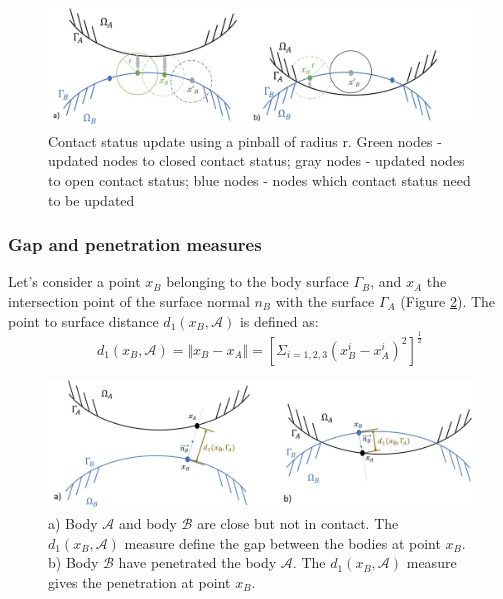 \begin{figure}[!h]
\centering
\includegraphics[width=1\textwidth,keepaspectratio]{figures/pinball.jpg} 
\caption{Contact status update using a pinball of radius r. Green nodes - updated nodes to closed contact status; gray nodes - updated nodes to open contact status; blue nodes - nodes which contact status need to be updated}
\label{fig:pinball}
\end{figure}

 
 \subsubsection*{Gap and penetration measures} 
  Let's consider a point $x_B$ belonging to the body surface $\Gamma_B$, and $x_A$ the intersection point of the surface normal $n_B$ with the surface $\Gamma_A$ (Figure \ref{gap_penetration}). The point to surface distance $d_1(x_B,\mathcal{A})$  is defined as:
\begin{equation}
\label{normalContactdistance}
d_1(x_B,\mathcal{A}) = \Vert x_B-x_A \Vert = \left[  \Sigma_{i={1,2,3}}\left( x_B^i - x_A^i \right)^2\right]^{\frac{1}{2}}
\end{equation}


\begin{figure}[!h]
\centering
\includegraphics[width=1\textwidth,keepaspectratio]{figures/gap_penetration.jpg}
\caption{a) Body $\mathcal{A}$ and body $\mathcal{B}$ are close but not in contact. The $d_1(x_B,\mathcal{A})$ measure define the gap between the bodies at point $x_B$.  b) Body $\mathcal{B}$ have penetrated the body $\mathcal{A}$. The $d_1(x_B,\mathcal{A})$ measure gives the penetration at point $x_B$.}
\label{gap_penetration}
\end{figure}

